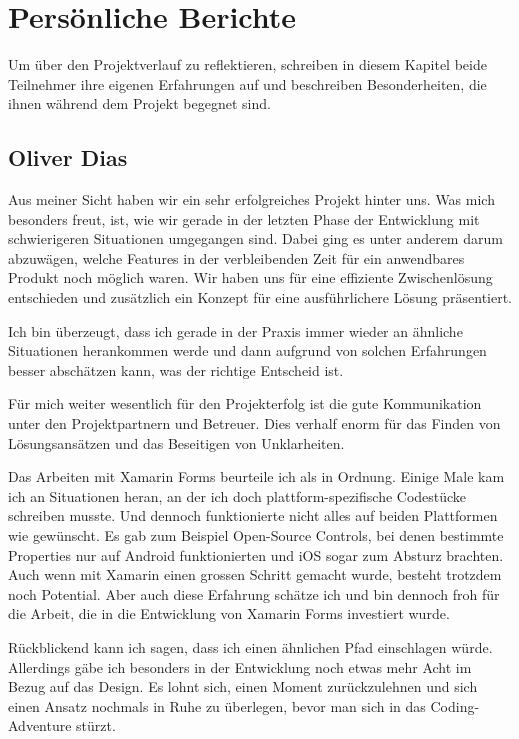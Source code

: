 \section{Persönliche Berichte}
Um über den Projektverlauf zu reflektieren, schreiben in diesem Kapitel beide Teilnehmer ihre eigenen Erfahrungen auf und beschreiben Besonderheiten, die ihnen während dem Projekt begegnet sind. 

\subsection{Oliver Dias}
Aus meiner Sicht haben wir ein sehr erfolgreiches Projekt hinter uns. Was mich besonders freut, ist, wie wir gerade in der letzten Phase der Entwicklung mit schwierigeren Situationen umgegangen sind. Dabei ging es unter anderem darum abzuwägen, welche Features in der verbleibenden Zeit für ein anwendbares Produkt noch möglich waren. Wir haben uns für eine effiziente Zwischenlösung entschieden und zusätzlich ein Konzept für eine ausführlichere Lösung präsentiert. 

Ich bin überzeugt, dass ich gerade in der Praxis immer wieder an ähnliche Situationen herankommen werde und dann aufgrund von solchen Erfahrungen besser abschätzen kann, was der richtige Entscheid ist. 

Für mich weiter wesentlich für den Projekterfolg ist die gute Kommunikation unter den Projektpartnern und Betreuer. Dies verhalf enorm für das Finden von Lösungsansätzen und das Beseitigen von Unklarheiten.

Das Arbeiten mit Xamarin Forms beurteile ich als in Ordnung. Einige Male kam ich an Situationen heran, an der ich doch plattform-spezifische Codestücke schreiben musste. Und dennoch funktionierte nicht alles auf beiden Plattformen wie gewünscht. Es gab zum Beispiel Open-Source Controls, bei denen bestimmte Properties nur auf Android funktionierten und iOS sogar zum Absturz brachten. Auch wenn mit Xamarin einen grossen Schritt gemacht wurde, besteht trotzdem noch Potential. Aber auch diese Erfahrung schätze ich und bin dennoch froh für die Arbeit, die in die Entwicklung von Xamarin Forms investiert wurde. 

Rückblickend kann ich sagen, dass ich einen ähnlichen Pfad einschlagen würde. Allerdings gäbe ich besonders in der Entwicklung noch etwas mehr Acht im Bezug auf das Design. Es lohnt sich, einen Moment zurückzulehnen und sich einen Ansatz nochmals in Ruhe zu überlegen, bevor man sich in das Coding-Adventure stürzt.
\newpage

